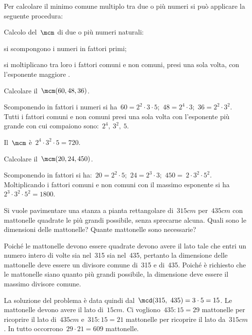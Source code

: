 Per calcolare il minimo comune multiplo tra due o più numeri si può 
applicare la seguente procedura:

\begin{procedura}
Calcolo del~\(\mcm\) di due o più numeri naturali:
\begin{enumeratea}
 \item si scompongono i numeri in fattori primi;
 \item si moltiplicano tra loro i fattori comuni e non comuni, 
  presi una sola volta, con l'esponente maggiore .
\end{enumeratea}
\end{procedura}


 \begin{esempio}
 Calcolare il~\(\mcm(60,48,36)\).

Scomponendo in fattori i numeri si 
ha~\(60=2^2\cdot3\cdot5\);~\(48=2^4\cdot3\);~\(36 =2^2\cdot3^2\).
Tutti i fattori comuni e non comuni presi una sola volta con l'esponente 
più grande con cui compaiono sono:~\(2^4,~3^2,~5\).

Il~\(\mcm\) è~\(2^4\cdot3^2\cdot5=720\).
 \end{esempio}

 \begin{esempio}
 Calcolare il~\(\mcm(20,24,450)\).

Scomponendo in fattori si 
ha:~\(20=2^2\cdot5\);~\(24=2^3\cdot3\);~\(450 =~2\cdot3^2\cdot5^2\).
Moltiplicando i fattori comuni e non comuni con il massimo esponente 
si ha~\(2^3\cdot3^2\cdot5^2=1800\).
 \end{esempio}

 \begin{esempio}
 Si vuole pavimentare una stanza a pianta rettangolare di~\(315\unit{cm}\) 
 per~\(435\unit{cm}\) con mattonelle quadrate le più grandi possibile, 
 senza sprecarne alcuna. Quali sono le dimensioni delle 
 mattonelle? Quante mattonelle sono necessarie?

Poiché le mattonelle devono essere quadrate devono avere il lato tale che 
entri un numero intero di volte sia nel~315 sia nel~435, pertanto la 
dimensione delle mattonelle deve essere un divisore comune
di~315 e di~435. Poiché è richiesto che le mattonelle siano quanto più 
grandi possibile, la dimensione deve essere il massimo divisore comune.
\begin{center}
 
% 
\end{center}
La soluzione del problema è data quindi dal~\(\mcd(315,~435)=3 \cdot 5=15\). 
Le mattonelle devono avere il lato di~\(15\unit{cm}\).
Ci vogliono~\(435:15=29\) mattonelle per ricoprire il lato 
di~\(435\unit{cm}\) e~\(315:15=21\) mattonelle per ricoprire il lato
da~\(315\unit{cm}\). In tutto occorrono~\(29\cdot21=609\) mattonelle.
\end{esempio}

